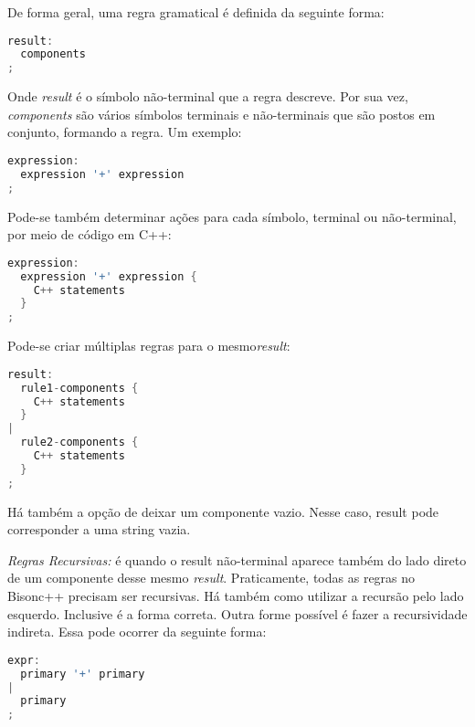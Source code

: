 \begin{apendicesenv}
De forma geral, uma regra gramatical é definida da seguinte forma:

\begin{lstlisting}[language=c,  caption=Definição de regra gramatical]
result:
  components
;
\end{lstlisting}

\par
\indent Onde \textit{result} é o símbolo não-terminal que a regra descreve. Por sua vez,  \textit{components} são vários símbolos terminais e não-terminais que são postos em conjunto, formando a regra. Um exemplo:
\begin{lstlisting}[language=c,  caption=Exemplo de regra gramatical]
expression:
  expression '+' expression
;
\end{lstlisting}

\par 
\indent Pode-se também determinar ações para cada símbolo, terminal ou não-terminal, por meio de código em C++:
\begin{lstlisting}[language=c,  caption=Exemplo de regra gramatical utilizando C++]
expression:
  expression '+' expression {
    C++ statements
  }
;
\end{lstlisting}

\par 
\indent Pode-se criar múltiplas regras para o mesmo\textit{result}:

\begin{lstlisting}[language=c,  caption=Exemplo de regra gramatical utilizando múltiplas regras]
result:
  rule1-components {
    C++ statements
  }
|
  rule2-components {
    C++ statements
  }
;
\end{lstlisting}

\par 
\indent Há também a opção de deixar um componente vazio. Nesse caso, result pode corresponder a uma string vazia.
\par 
\indent \textit{Regras Recursivas:} é quando o result não-terminal aparece também do lado direto de um componente desse mesmo \textit{result}. Praticamente, todas as regras no Bisonc++ precisam ser recursivas. Há também como utilizar a recursão pelo lado esquerdo. Inclusive é a forma correta. Outra forme possível é fazer a recursividade indireta. Essa pode ocorrer da seguinte forma:

\begin{lstlisting}[language=c,  caption=Exemplo de regra gramatical utilizando recursividade]
expr:     
  primary '+' primary
|
  primary
;


\end{lstlisting}
\end{apendicesenv}
